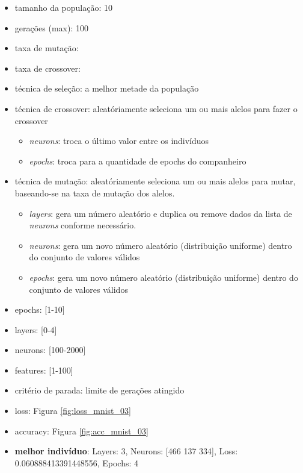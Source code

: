 \documentclass[twoside,conference,a4paper]{IEEEtran}
\begin{document}
\begin{itemize}
    \item tamanho da população: 10
    \item gerações (max): 100
    \item taxa de mutação:
    \item taxa de crossover:
    \item técnica de seleção: a melhor metade da população
    \item técnica de crossover: aleatóriamente seleciona um ou mais alelos para fazer o crossover
    \begin{itemize}
        \item \emph{neurons}: troca o último valor entre os indivíduos
        \item \emph{epochs}: troca para a quantidade de epochs do companheiro
    \end{itemize}
    \item técnica de mutação: aleatóriamente seleciona um ou mais alelos para mutar, baseando-se na taxa de mutação dos alelos.
    \begin{itemize}
        \item \emph{layers}: gera um número aleatório e duplica ou remove dados da lista de \emph{neurons} conforme necessário.
        \item \emph{neurons}: gera um novo número aleatório (distribuição uniforme) dentro do conjunto de valores válidos
        \item \emph{epochs}: gera um novo número aleatório (distribuição uniforme) dentro do conjunto de valores válidos
    \end{itemize}
    \item epochs: [1-10]
    \item layers: [0-4]
    \item neurons: [100-2000]
    \item features: [1-100]
    \item critério de parada: limite de gerações atingido
    \item loss: Figura \ref{fig:loss_mnist_03}
    \item accuracy: Figura \ref{fig:acc_mnist_03}
    \item \textbf{melhor indivíduo}: Layers: 3, Neurons: [466 137 334], Loss: 0.060888413391448556, Epochs: 4
\end{itemize}
\end{document}
